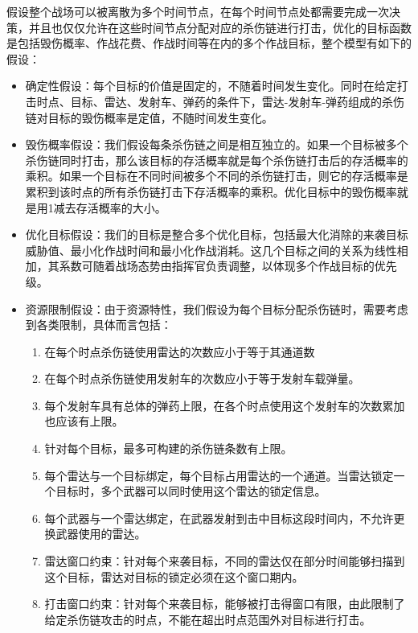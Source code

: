 假设整个战场可以被离散为多个时间节点，在每个时间节点处都需要完成一次决策，并且也仅仅允许在这些时间节点分配对应的杀伤链进行打击，优化的目标函数是包括毁伤概率、作战花费、作战时间等在内的多个作战目标，整个模型有如下的假设：

\begin{itemize}
    \item 确定性假设：每个目标的价值是固定的，不随着时间发生变化。同时在给定打击时点、目标、雷达、发射车、弹药的条件下，雷达-发射车-弹药组成的杀伤链对目标的毁伤概率是定值，不随时间发生变化。
    \item 毁伤概率假设：我们假设每条杀伤链之间是相互独立的。如果一个目标被多个杀伤链同时打击，那么该目标的存活概率就是每个杀伤链打击后的存活概率的乘积。如果一个目标在不同时间被多个不同的杀伤链打击，则它的存活概率是累积到该时点的所有杀伤链打击下存活概率的乘积。优化目标中的毁伤概率就是用1减去存活概率的大小。
    \item 优化目标假设：我们的目标是整合多个优化目标，包括最大化消除的来袭目标威胁值、最小化作战时间和最小化作战消耗。这几个目标之间的关系为线性相加，其系数可随着战场态势由指挥官负责调整，以体现多个作战目标的优先级。
    \item 资源限制假设：由于资源特性，我们假设为每个目标分配杀伤链时，需要考虑到各类限制，具体而言包括：
    \begin{enumerate}[label=\roman*.]
        \item 在每个时点杀伤链使用雷达的次数应小于等于其通道数
        \item 在每个时点杀伤链使用发射车的次数应小于等于发射车载弹量。
        \item 每个发射车具有总体的弹药上限，在各个时点使用这个发射车的次数累加也应该有上限。
        \item 针对每个目标，最多可构建的杀伤链条数有上限。
        \item 每个雷达与一个目标绑定，每个目标占用雷达的一个通道。当雷达锁定一个目标时，多个武器可以同时使用这个雷达的锁定信息。
        \item 每个武器与一个雷达绑定，在武器发射到击中目标这段时间内，不允许更换武器使用的雷达。
        \item 雷达窗口约束：针对每个来袭目标，不同的雷达仅在部分时间能够扫描到这个目标，雷达对目标的锁定必须在这个窗口期内。
        \item 打击窗口约束：针对每个来袭目标，能够被打击得窗口有限，由此限制了给定杀伤链攻击的时点，不能在超出时点范围外对目标进行打击。
    \end{enumerate}
\end{itemize}

